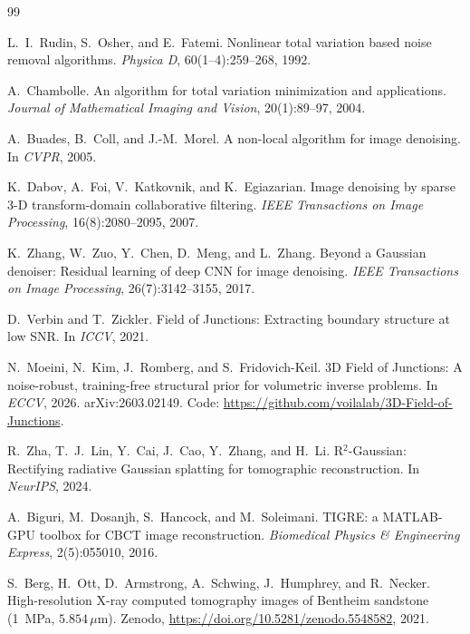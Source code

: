 \documentclass[11pt]{article}
\begin{document}
\begin{thebibliography}{99}

L.~I.~Rudin, S.~Osher, and E.~Fatemi.
\newblock Nonlinear total variation based noise removal algorithms.
\newblock \emph{Physica D}, 60(1--4):259--268, 1992.

A.~Chambolle.
\newblock An algorithm for total variation minimization and applications.
\newblock \emph{Journal of Mathematical Imaging and Vision}, 20(1):89--97,
2004.

A.~Buades, B.~Coll, and J.-M.~Morel.
\newblock A non-local algorithm for image denoising.
\newblock In \emph{CVPR}, 2005.

K.~Dabov, A.~Foi, V.~Katkovnik, and K.~Egiazarian.
\newblock Image denoising by sparse 3-D transform-domain collaborative
filtering.
\newblock \emph{IEEE Transactions on Image Processing}, 16(8):2080--2095,
2007.

K.~Zhang, W.~Zuo, Y.~Chen, D.~Meng, and L.~Zhang.
\newblock Beyond a Gaussian denoiser: Residual learning of deep CNN for
image denoising.
\newblock \emph{IEEE Transactions on Image Processing}, 26(7):3142--3155,
2017.

D.~Verbin and T.~Zickler.
\newblock Field of Junctions: Extracting boundary structure at low SNR.
\newblock In \emph{ICCV}, 2021.

N.~Moeini, N.~Kim, J.~Romberg, and S.~Fridovich-Keil.
\newblock 3D Field of Junctions: A noise-robust, training-free structural prior
for volumetric inverse problems.
\newblock In \emph{ECCV}, 2026. arXiv:2603.02149.
\newblock Code: \url{https://github.com/voilalab/3D-Field-of-Junctions}.

R.~Zha, T.~J.~Lin, Y.~Cai, J.~Cao, Y.~Zhang, and H.~Li.
\newblock R$^2$-Gaussian: Rectifying radiative Gaussian splatting for
tomographic reconstruction.
\newblock In \emph{NeurIPS}, 2024.

A.~Biguri, M.~Dosanjh, S.~Hancock, and M.~Soleimani.
\newblock TIGRE: a MATLAB-GPU toolbox for CBCT image reconstruction.
\newblock \emph{Biomedical Physics \& Engineering Express}, 2(5):055010, 2016.

S.~Berg, H.~Ott, D.~Armstrong, A.~Schwing, J.~Humphrey, and R.~Necker.
\newblock High-resolution X-ray computed tomography images of Bentheim
sandstone (1~MPa, $5.854\,\mu\mathrm{m}$).
\newblock Zenodo, \url{https://doi.org/10.5281/zenodo.5548582}, 2021.


\end{thebibliography}
\end{document}
